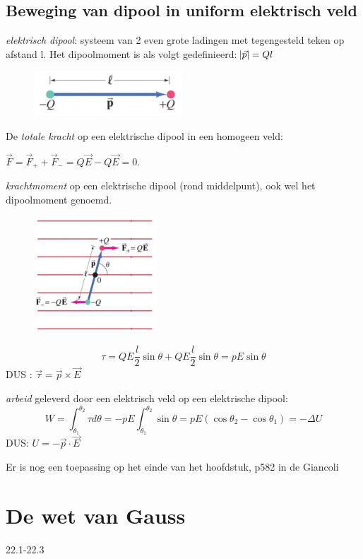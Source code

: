 \documentclass[12pt,a4paper]{article}
\begin{document}
	\subsection{Beweging van dipool in uniform elektrisch veld}
	\textit{elektrisch dipool}: systeem van 2 even grote ladingen met tegengesteld teken op afstand l.
	Het dipoolmoment is als volgt gedefinieerd: \(\abs{\vec{p}} = Ql\)
	\begin{figure}[h]
		\centering
		\includegraphics[width=0.3\linewidth]{dipool}
		\label{fig:dipool}
	\end{figure}

	De \textit{totale kracht} op een elektrische dipool in een homogeen veld: 

	\(\vec{F} = \vec{F}_+ + \vec{F}_- = Q\vec{E} - Q\vec{E} = 0\).
	
	\textit{krachtmoment} op een elektrische dipool (rond middelpunt), ook wel het dipoolmoment genoemd. 
	\begin{figure}[h]
		\centering
		\includegraphics[width=0.4\linewidth]{dippoolmoment}
		\label{fig:dippoolmoment}
	\end{figure}
	\newpage
	\[\tau = QE\frac{l}{2}\sin\theta + QE\frac{l}{2}\sin\theta = pE\sin\theta\]	
	DUS : \(\vec{\tau} = \vec{p} \times \vec{E}\)
	
	\textit{arbeid} geleverd door een elektrisch veld op een elektrische dipool:
	\[W = \int_{\theta_1}^{\theta_2}\tau d\theta = -pE\int_{\theta_1}^{\theta_2}\sin\theta = pE(\cos\theta_2 - \cos\theta_1) = -\Delta U\]
	DUS: \(U = -\vec{p} \cdot \vec{E}\)
	
	Er is nog een toepassing op het einde van het hoofdstuk, p582 in de Giancoli
	
    \section{De wet van Gauss}
    22.1-22.3
\end{document}
